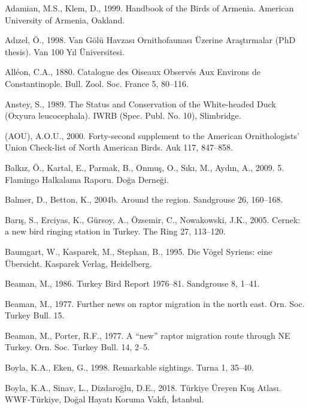 \documentclass[
  a4paper,
  DIV=11,
  numbers=noendperiod]{scrartcl}
\newlength{\cslhangindent}
\newenvironment{CSLReferences}[2] %
 {\begin{list}{}{%
  \setlength{\itemindent}{0pt}
  \setlength{\leftmargin}{0pt}
  \setlength{\parsep}{0pt}
  \ifodd #1
   \setlength{\leftmargin}{\cslhangindent}
   \setlength{\itemindent}{-1\cslhangindent}
  \fi
  \setlength{\itemsep}{#2\baselineskip}}}
 {\end{list}}
\begin{document}
\label{refs}
\begin{CSLReferences}{1}{0}
Adamian, M.S., Klem, D., 1999. {Handbook of the Birds of Armenia}.
American University of Armenia, Oakland.

Adızel, Ö., 1998. {Van Gölü Havzası Ornithofaunası Üzerine Araştırmalar}
(PhD thesis). Van 100 Yıl Üniversitesi.

Alléon, C.A., 1880. {Catalogue des Oiseaux Observés Aux Environs de
Constantinople}. Bull. Zool. Soc. France 5, 80--116.

Anstey, S., 1989. {The Status and Conservation of the White-headed Duck
({Oxyura leucocephala})}. IWRB (Spec. Publ. No. 10), Slimbridge.

(AOU), A.O.U., 2000. {Forty-second supplement to the American
Ornithologists' Union Check-list of North American Birds}. Auk 117,
847--858.

Balkız, Ö., Kartal, E., Parmak, B., Onmuş, O., Sıkı, M., Aydın, A.,
2009. {5. Flamingo Halkalama Raporu}. Doğa Derneği.

Balmer, D., Betton, K., 2004b. {Around the region}. Sandgrouse 26,
160--168.

Barış, S., Erciyas, K., Gürsoy, A., Özsemir, C., Nowakowski, J.K., 2005.
{Cernek: a new bird ringing station in Turkey}. The Ring 27, 113--120.

Baumgart, W., Kasparek, M., Stephan, B., 1995. {Die Vögel Syriens: eine
Übersicht}. Kasparek Verlag, Heidelberg.

Beaman, M., 1986. {Turkey Bird Report 1976--81}. Sandgrouse 8, 1--41.

Beaman, M., 1977. {Further news on raptor migration in the north east}.
Orn. Soc. Turkey Bull. 15.

Beaman, M., Porter, R.F., 1977. {A {``new''} raptor migration route
through NE Turkey}. Orn. Soc. Turkey Bull. 14, 2--5.

Boyla, K.A., Eken, G., 1998. {Remarkable sightings}. Turna 1, 35--40.

Boyla, K.A., Sinav, L., Dizdaroğlu, D.E., 2018. {Türkiye Üreyen Kuş
Atlası}. WWF-Türkiye, Doğal Hayatı Koruma Vakfı, İstanbul.


\end{CSLReferences}
\end{document}
